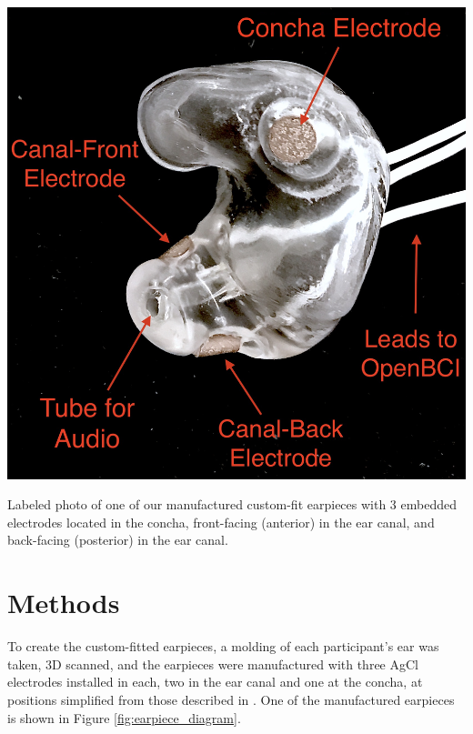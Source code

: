 \documentclass{sigchi-ext}
\begin{document}
\begin{marginfigure}[-20pc]
\begin{minipage}{\marginparwidth}
  \centering
  \includegraphics[width=0.9\marginparwidth]{figures/CFEEEG_piecefig_Right.jpg}
  \caption{Labeled photo of one of our manufactured custom-fit earpieces with 3 embedded electrodes located in the concha, front-facing (anterior) in the ear canal, and back-facing (posterior) in the ear canal.}\label{fig:earpiece_diagram}
\end{minipage}
\end{marginfigure}

\section{Methods}
To create the custom-fitted earpieces, a molding of each participant's ear was taken, 3D scanned, and the earpieces were manufactured with three AgCl electrodes installed in each, two in the ear canal and one at the concha, at positions simplified from those described in \cite{Mikkelsen2015}. One of the manufactured earpieces is shown in Figure \ref{fig:earpiece_diagram}.
\end{document}
